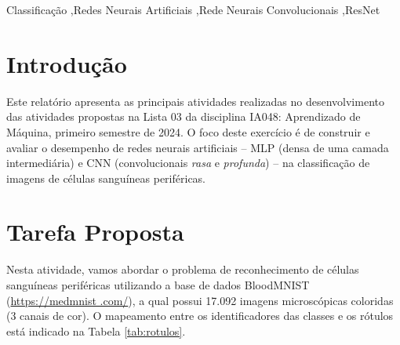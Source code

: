 \documentclass[final,5p]{elsarticle}
\numberwithin{equation}{section}
\begin{document}
\begin{frontmatter}

\begin{keyword}
    Classificação \sep Redes Neurais Artificiais \sep Rede Neurais Convolucionais \sep ResNet



\end{keyword}

\end{frontmatter}

\section{Introdução}

    Este relatório apresenta as principais atividades realizadas no desenvolvimento das atividades propostas na Lista 03 da disciplina IA048: Aprendizado de Máquina, primeiro semestre de 2024. O foco deste exercício é de construir e avaliar o desempenho de redes neurais artificiais -- MLP (densa de uma camada intermediária) e CNN (convolucionais \emph{rasa} e \emph{profunda}) -- na classificação de imagens de células sanguíneas periféricas.

\section{Tarefa Proposta}

    Nesta atividade, vamos abordar o problema de reconhecimento de células sanguíneas periféricas utilizando a base de dados BloodMNIST \cite{medmnistv1,medmnistv2, acevedo2020dataset} (\href{https://medmnist.com/}{https://medmnist .com/}), a qual possui 17.092 imagens microscópicas coloridas (3 canais de cor). O mapeamento entre os identificadores das classes e os rótulos está indicado na Tabela \ref{tab:rotulos}.
\end{document}
